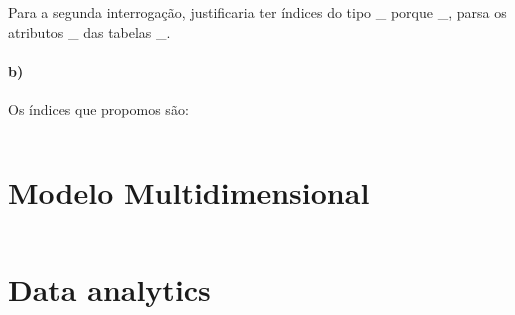 \documentclass[10pt,a4paper]{article}
\begin{document}
Para a segunda interrogação, justificaria ter índices do tipo \_ porque \_, parsa os atributos \_ das tabelas \_.
\paragraph{b)}
Os índices que propomos são:
\begin{verbatim}
\end{verbatim}

\section{Modelo Multidimensional}
\begin{verbatim}
\end{verbatim}


\section{Data analytics}
\begin{verbatim}
\end{verbatim}
\end{document}
